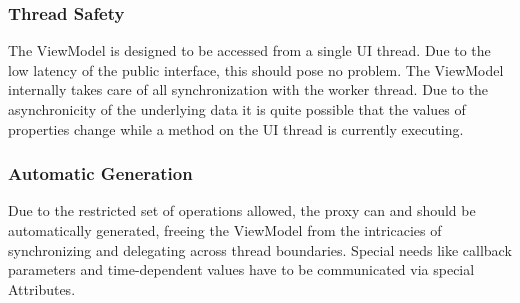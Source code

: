 \subsubsection{Thread Safety}

The ViewModel is designed to be accessed from a single UI thread. Due to the
low latency of the public interface, this should pose no problem. The ViewModel
internally takes care of all synchronization with the worker thread. Due to the
asynchronicity of the underlying data it is quite possible that the values of
properties change while a method on the UI thread is currently executing.

\subsubsection{Automatic Generation}

Due to the restricted set of operations allowed, the proxy can and should be
automatically generated, freeing the ViewModel from the intricacies of
synchronizing and delegating across thread boundaries. Special needs like
callback parameters and time-dependent values have to be communicated via
special Attributes.

